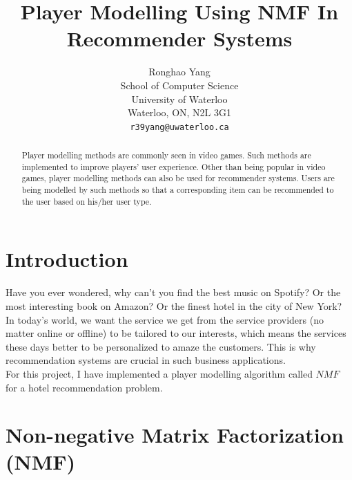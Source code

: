 \documentclass[11pt]{article} %
\title{Player Modelling Using NMF In Recommender Systems}
\author{
	Ronghao Yang \\
	School of Computer Science\\
	University of Waterloo\\
	Waterloo, ON, N2L 3G1 \\
	\texttt{r39yang@uwaterloo.ca}
}
\begin{document}
\maketitle

\begin{abstract}
Player modelling methods are commonly seen in video games. Such methods are implemented to improve players' user experience. Other than being popular in video games, player modelling methods can also be used for recommender systems. Users are being modelled by such methods so that a corresponding item can be recommended to the user based on his/her user type.

\end{abstract}
\section{Introduction}
Have you ever wondered, why can't you find the best music on Spotify? Or the most interesting book on Amazon? Or the finest hotel in the city of New York? In today's world, we want the service we get from the service providers (no matter online or offline) to be tailored to our interests, which means the services these days better to be personalized to amaze the customers. This is why recommendation systems are crucial in such business applications.\\
For this project, I have implemented a player modelling algorithm called $NMF$ for a hotel recommendation problem. 
\section{Non-negative Matrix Factorization (NMF)}
\end{document}
